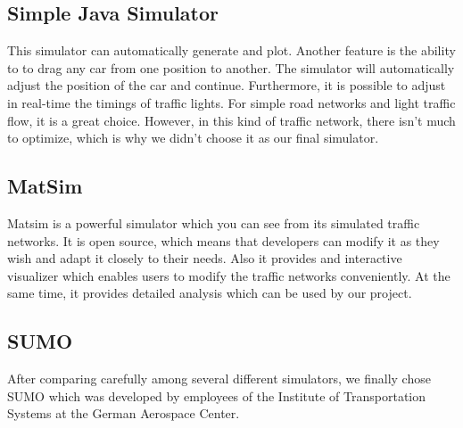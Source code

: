 \documentclass{article} %
\begin{document}
\subsection{Simple Java Simulator}

This simulator can automatically generate and plot. Another feature is the ability to to drag any car from one position to another. The simulator will automatically adjust the position of the car and continue. Furthermore, it is possible to adjust in real-time the timings of traffic lights. For simple road networks and light traffic flow, it is a great choice. However, in this kind of traffic network, there isn't much to optimize, which is why we didn't choose it as our final simulator. 

\subsection{MatSim}

Matsim is a powerful simulator which you can see from its simulated traffic networks. 
It is open source, which means that developers can modify it as they wish and adapt it closely to their needs. Also it provides and interactive visualizer which enables users to modify the traffic networks conveniently. At the same time, it provides detailed analysis which can be used by our project.

\subsection{SUMO}
After comparing carefully among several different simulators, we finally chose SUMO which was developed by employees of the Institute of Transportation Systems at the German Aerospace Center.
\end{document}
